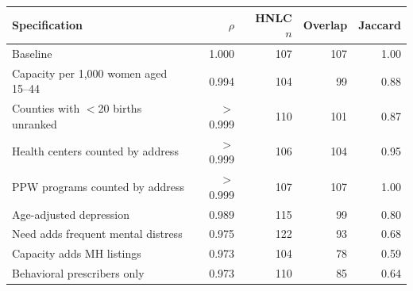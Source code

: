 \begin{tabular}{@{}lrrrr@{}}
\toprule
Specification & $\rho$ & HNLC $n$ & Overlap & Jaccard \\
\midrule
Baseline & 1.000 & 107 & 107 & 1.00 \\
Capacity per 1,000 women aged 15--44 & 0.994 & 104 & 99 & 0.88 \\
Counties with $<$20 births unranked & $>$0.999 & 110 & 101 & 0.87 \\
Health centers counted by address & $>$0.999 & 106 & 104 & 0.95 \\
PPW programs counted by address & $>$0.999 & 107 & 107 & 1.00 \\
Age-adjusted depression & 0.989 & 115 & 99 & 0.80 \\
Need adds frequent mental distress & 0.975 & 122 & 93 & 0.68 \\
Capacity adds MH listings & 0.973 & 104 & 78 & 0.59 \\
Behavioral prescribers only & 0.973 & 110 & 85 & 0.64 \\
\bottomrule
\end{tabular}